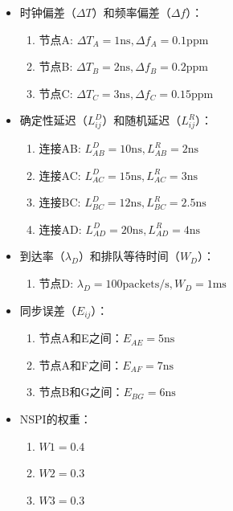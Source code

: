 \documentclass[UTF8,a4paper,12pt]{ctexart}
\numberwithin{equation}{section}
\begin{document}
\begin{itemize}
	\item 时钟偏差（$\Delta T$）和频率偏差（$\Delta f$）：
	\begin{enumerate}
		\item 节点A: $\Delta T_A = 1 \text{ns}, \Delta f_A = 0.1 \text{ppm}$
		\item 节点B: $\Delta T_B = 2 \text{ns}, \Delta f_B = 0.2 \text{ppm}$
		\item 节点C: $\Delta T_C = 3 \text{ns}, \Delta f_C = 0.15 \text{ppm}$
	\end{enumerate}
	
	\item 确定性延迟（$L_{ij}^D$）和随机延迟（$L_{ij}^R$）：
	\begin{enumerate}
		\item 连接AB: $L_{AB}^D = 10 \text{ns}, L_{AB}^R = 2 \text{ns}$
		\item 连接AC: $L_{AC}^D = 15 \text{ns}, L_{AC}^R = 3 \text{ns}$
		\item 连接BC: $L_{BC}^D = 12 \text{ns}, L_{BC}^R = 2.5 \text{ns}$
		\item 连接AD: $L_{AD}^D = 20 \text{ns}, L_{AD}^R = 4 \text{ns}$
	\end{enumerate}
	
	\item 到达率（$\lambda_D$）和排队等待时间（$W_D$）：
	\begin{enumerate}
		\item 节点D: $\lambda_D = 100 \text{packets/s}, W_D = 1 \text{ms}$
	\end{enumerate}
	
	\item 同步误差（$E_{ij}$）：
	\begin{enumerate}
		\item 节点A和E之间：$E_{AE} = 5 \text{ns}$
		\item 节点A和F之间：$E_{AF} = 7 \text{ns}$
		\item 节点B和G之间：$E_{BG} = 6 \text{ns}$
	\end{enumerate}
	
	\item NSPI的权重：
	\begin{enumerate}
		\item $W1 = 0.4$
		\item $W2 = 0.3$
		\item $W3 = 0.3$
	\end{enumerate}
\end{itemize}
\end{document}
